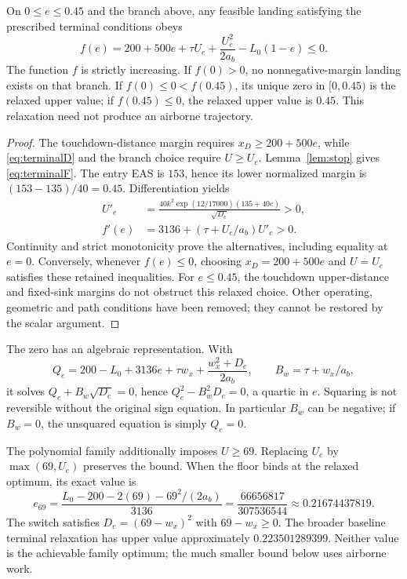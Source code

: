 \begin{proposition}\label{prop:terminal}
On $0\leq e\leq0.45$ and the branch above, any feasible landing satisfying the prescribed terminal conditions obeys
\begin{equation}\label{eq:terminalF}
 f(e)=200+500e+\tau U_e+\frac{U_e^2}{2a_b}-L_0(1-e)\leq0.
\end{equation}
The function $f$ is strictly increasing. If $f(0)>0$, no nonnegative-margin landing exists on that branch. If $f(0)\leq0<f(0.45)$, its unique zero in $[0,0.45)$ is the relaxed upper value; if $f(0.45)\leq0$, the relaxed upper value is $0.45$. This relaxation need not produce an airborne trajectory.
\end{proposition}
\begin{proof}
The touchdown-distance margin requires $x_D\geq200+500e$, while \eqref{eq:terminalD} and the branch choice require $U\geq U_e$. Lemma~\ref{lem:stop} gives \eqref{eq:terminalF}. The entry EAS is $153$, hence its lower normalized margin is $(153-135)/40=0.45$. Differentiation yields
\begin{align*}
 U'_e&=\frac{40k^2 \exp(12/17000)(135+40e)}{\sqrt{D_e}}>0,\\
 f'(e)&=3136+(\tau+U_e/a_b)U'_e>0.
\end{align*}
Continuity and strict monotonicity prove the alternatives, including equality at $e=0$. Conversely, whenever $f(e)\leq0$, choosing $x_D=200+500e$ and $U=U_e$ satisfies these retained inequalities. For $e\leq0.45$, the touchdown upper-distance and fixed-sink margins do not obstruct this relaxed choice. Other operating, geometric and path conditions have been removed; they cannot be restored by the scalar argument.
\end{proof}

The zero has an algebraic representation. With
\[
 Q_e=200-L_0+3136e+\tau w_x+\frac{w_x^2+D_e}{2a_b},
 \qquad B_w=\tau+w_x/a_b,
\]
it solves $Q_e+B_w\sqrt{D_e}=0$, hence $Q_e^2-B_w^2D_e=0$, a quartic in $e$. Squaring is not reversible without the original sign equation. In particular $B_w$ can be negative; if $B_w=0$, the unsquared equation is simply $Q_e=0$.

The polynomial family additionally imposes $U\geq69$. Replacing $U_e$ by $\max(69,U_e)$ preserves the bound. When the floor binds at the relaxed optimum, its exact value is
\begin{equation}\label{eq:eta69}
 e_{69}=\frac{L_0-200-2(69)-69^2/(2a_b)}{3136}
 =\frac{66656817}{307536544}\approx0.21674437819.
\end{equation}
The switch satisfies $D_e=(69-w_x)^2$ with $69-w_x\geq0$. The broader baseline terminal relaxation has upper value approximately $0.223501289399$. Neither value is the achievable family optimum; the much smaller bound below uses airborne work.

